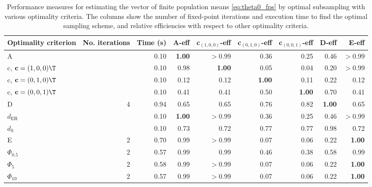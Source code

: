\begin{table}[htb!]
\centering
\caption{Performance measures for estimating the vector of finite population means \eqref{eq:theta0_fps} by optimal subsampling with various optimality criteria. The columns show the number of fixed-point iterations and execution time to find the optimal sampling scheme, and relative efficiencies with respect to other optimality criteria.} 
\label{tab:finite_population_inference}
\begin{tabular}{lrrrrrrrr}
 Optimality criterion & No. iterations & Time (s) & A-eff & c$_{(1,0,0)}$-eff & c$_{(0,1,0)}$-eff & c$_{(0,0,1)}$-eff & D-eff & E-eff \\ 
  \hline
A &  & 0.10 & \textbf{1.00} & $>$0.99 & 0.36 & 0.25 & 0.46 & $>$0.99 \\ 
  c, $\mathbf{c} = (1,0,0)\T$ &  & 0.10 & 0.98 & \textbf{1.00} & 0.05 & 0.04 & 0.20 & $>$0.99 \\ 
  c, $\mathbf{c} = (0,1,0)\T$ &  & 0.10 & 0.12 & 0.12 & \textbf{1.00} & 0.11 & 0.22 & 0.12 \\ 
  c, $\mathbf{c} = (0,0,1)\T$ &  & 0.10 & 0.41 & 0.41 & 0.50 & \textbf{1.00} & 0.70 & 0.41 \\ 
  D & 4 & 0.94 & 0.65 & 0.65 & 0.76 & 0.82 & \textbf{1.00} & 0.65 \\ 
  $d_{\mathrm{ER}}$ &  & 0.10 & \textbf{1.00} & $>$0.99 & 0.36 & 0.25 & 0.46 & $>$0.99 \\ 
  $d_{\mathrm{S}}$ &  & 0.10 & 0.73 & 0.72 & 0.77 & 0.77 & 0.98 & 0.72 \\ 
  E & 2 & 0.70 & 0.99 & $>$0.99 & 0.07 & 0.06 & 0.22 & \textbf{1.00} \\ 
  $\Phi_{0.5}$ & 2 & 0.57 & 0.99 & 0.99 & 0.46 & 0.38 & 0.58 & 0.99 \\ 
  $\Phi_5$ & 2 & 0.58 & 0.99 & $>$0.99 & 0.07 & 0.06 & 0.22 & \textbf{1.00} \\ 
  $\Phi_{10}$ & 2 & 0.57 & 0.99 & $>$0.99 & 0.07 & 0.06 & 0.22 & \textbf{1.00} \\ 
   \hline
\end{tabular}
\end{table}
